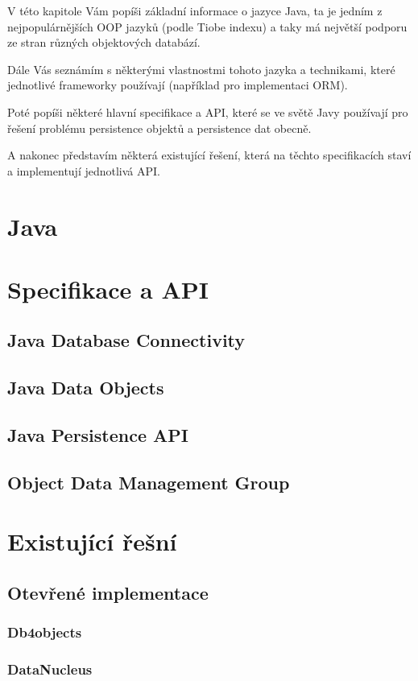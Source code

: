 V této kapitole Vám popíši základní informace o jazyce Java, ta je jedním z nejpopulárnějších OOP jazyků (podle Tiobe indexu) a taky má největší podporu ze stran různých objektových databází.

Dále Vás seznámím s některými vlastnostmi tohoto jazyka a technikami, které jednotlivé frameworky používají (například pro implementaci ORM).

Poté popíši některé hlavní specifikace a API, které se ve světě Javy používají pro řešení problému persistence objektů a persistence dat obecně. 

A nakonec představím některá existující řešení, která na těchto specifikacích staví a implementují jednotlivá API.
\section{Java}

\section{Specifikace a API}
\subsection{Java Database Connectivity}
\cite{fisher:jdbc,donahue:jdpb}
\subsection{Java Data Objects}
\cite{jordan:jdo,roos:jdo,tyagi:cjdo,ezzio:uujdo}
\subsection{Java Persistence API}
\cite{jpa:spec}
\subsection{Object Data Management Group}
\cite{odmg}
\section{Existující řešní}
\subsection{Otevřené implementace}
\subsubsection{Db4objects}
\subsubsection{DataNucleus}
